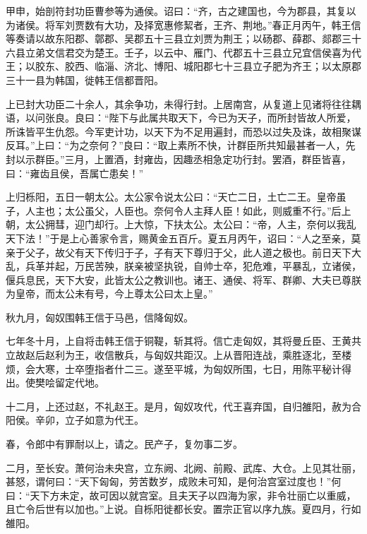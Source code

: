 \documentclass[12pt,UTF8]{ctexbook}
\begin{document}
甲申，始剖符封功臣曹参等为通侯。诏曰：“齐，古之建国也，今为郡县，其复以为诸侯。将军刘贾数有大功，及择宽惠修絜者，王齐、荆地。”春正月丙午，韩王信等奏请以故东阳郡、鄣郡、吴郡五十三县立刘贾为荆王；以砀郡、薛郡、郯郡三十六县立弟文信君交为楚王。壬子，以云中、雁门、代郡五十三县立兄宜信侯喜为代王；以胶东、胶西、临淄、济北、博阳、城阳郡七十三县立子肥为齐王；以太原郡三十一县为韩国，徙韩王信都晋阳。



上已封大功臣二十余人，其余争功，未得行封。上居南宫，从复道上见诸将往往耦语，以问张良。良曰：“陛下与此属共取天下，今已为天子，而所封皆故人所爱，所诛皆平生仇怨。今军吏计功，以天下为不足用遍封，而恐以过失及诛，故相聚谋反耳。”上曰：“为之奈何？”良曰：“取上素所不快，计群臣所共知最甚者一人，先封以示群臣。”三月，上置酒，封雍齿，因趣丞相急定功行封。罢酒，群臣皆喜，曰：“雍齿且侯，吾属亡患矣！”



上归栎阳，五日一朝太公。太公家令说太公曰：“天亡二日，土亡二王。皇帝虽子，人主也；太公虽父，人臣也。奈何令人主拜人臣！如此，则威重不行。”后上朝，太公拥彗，迎门却行。上大惊，下扶太公。太公曰：“帝，人主，奈何以我乱天下法！”于是上心善家令言，赐黄金五百斤。夏五月丙午，诏曰：“人之至亲，莫亲于父子，故父有天下传归于子，子有天下尊归于父，此人道之极也。前日天下大乱，兵革并起，万民苦殃，朕亲被坚执锐，自帅士卒，犯危难，平暴乱，立诸侯，偃兵息民，天下大安，此皆太公之教训也。诸王、通侯、将军、群卿、大夫已尊朕为皇帝，而太公未有号，今上尊太公曰太上皇。”



秋九月，匈奴围韩王信于马邑，信降匈奴。



七年冬十月，上自将击韩王信于铜鞮，斩其将。信亡走匈奴，其将曼丘臣、王黄共立故赵后赵利为王，收信散兵，与匈奴共距汉。上从晋阳连战，乘胜逐北，至楼烦，会大寒，士卒堕指者什二三。遂至平城，为匈奴所围，七日，用陈平秘计得出。使樊哙留定代地。



十二月，上还过赵，不礼赵王。是月，匈奴攻代，代王喜弃国，自归雒阳，赦为合阳侯。辛卯，立子如意为代王。



春，令郎中有罪耐以上，请之。民产子，复勿事二岁。



二月，至长安。萧何治未央宫，立东阙、北阙、前殿、武库、大仓。上见其壮丽，甚怒，谓何曰：“天下匈匈，劳苦数岁，成败未可知，是何治宫室过度也！”何曰：“天下方未定，故可因以就宫室。且夫天子以四海为家，非令壮丽亡以重威，且亡令后世有以加也。”上说。自栎阳徙都长安。置宗正官以序九族。夏四月，行如雒阳。
\end{document}
